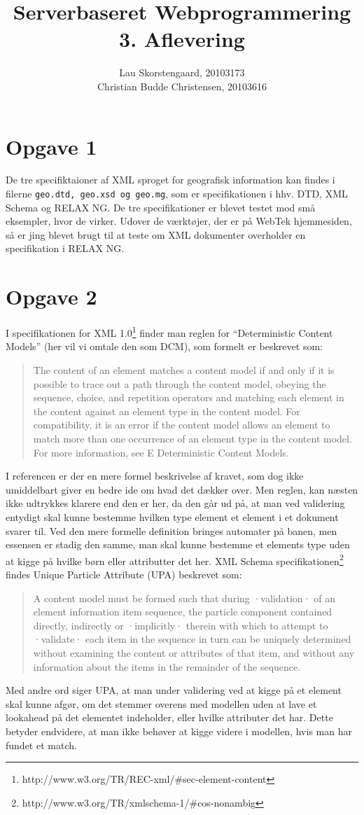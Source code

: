 \documentclass[a4paper,10pt]{article}
\author{Lau Skorstengaard, 20103173 \\Christian Budde Christensen, 20103616}
\title{Serverbaseret Webprogrammering\\3. Aflevering}
\begin{document}
\maketitle
\section*{Opgave 1}
De tre specifiktaioner af XML sproget for geografisk information kan findes i filerne \texttt{geo.dtd, geo.xsd og geo.mg}, som er specifikationen i hhv. DTD, XML Schema og RELAX NG. De tre specifikationer er blevet testet mod små eksempler, hvor de virker. Udover de værktøjer, der er på WebTek hjemmesiden, så er jing blevet brugt til at teste om XML dokumenter overholder en specifikation i RELAX NG.

\section*{Opgave 2}
I specifikationen for XML 1.0\footnote{http://www.w3.org/TR/REC-xml/#sec-element-content} finder man reglen for ``Deterministic Content Models'' (her vil vi omtale den som DCM), som formelt er beskrevet som:
\begin{quotation}
The content of an element matches a content model if and only if it is possible to trace out a path through the content model, obeying the sequence, choice, and repetition operators and matching each element in the content against an element type in the content model. For compatibility, it is an error if the content model allows an element to match more than one occurrence of an element type in the content model. For more information, see E Deterministic Content Models.
\end{quotation}
I referencen er der en mere formel beskrivelse af kravet, som dog ikke umiddelbart giver en bedre ide om hvad det dækker over. Men reglen, kan næsten ikke udtrykkes klarere end den er her, da den går ud på, at man ved validering entydigt skal kunne bestemme hvilken type element et element i et dokument svarer til. Ved den mere formelle definition bringes automater på banen, men essensen er stadig den samme, man skal kunne bestemme et elements type uden at kigge på hvilke børn eller attributter det her.  XML Schema specifikationen\footnote{http://www.w3.org/TR/xmlschema-1/#cos-nonambig} findes Unique Particle Attribute (UPA) beskrevet som:
\begin{quotation}
A content model must be formed such that during ·validation· of an element information item sequence, the particle component contained directly, indirectly or ·implicitly· therein with which to attempt to ·validate· each item in the sequence in turn can be uniquely determined without examining the content or attributes of that item, and without any information about the items in the remainder of the sequence.
\end{quotation}
Med andre ord siger UPA, at man under validering ved at kigge på et element skal kunne afgør, om det stemmer overens med modellen uden at lave et lookahead på det elementet indeholder, eller hvilke attributer det har. Dette betyder endvidere, at man ikke behøver at kigge videre i modellen, hvis man har fundet et match.
\end{document}
